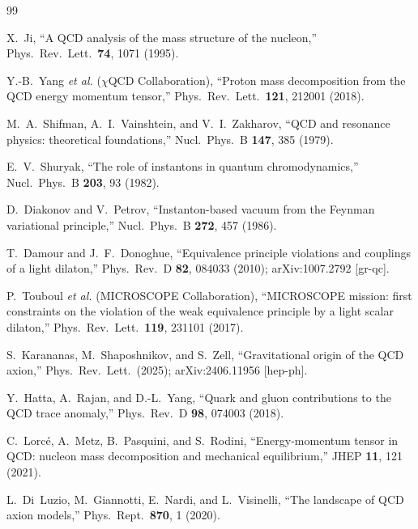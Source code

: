 \documentclass[aps,prd,twocolumn,superscriptaddress,floatfix,nofootinbib]{revtex4-2}
\begin{document}
\begin{thebibliography}{99}

X.~Ji, ``A QCD analysis of the mass structure of the nucleon,''
Phys.\ Rev.\ Lett.\ \textbf{74}, 1071 (1995).

Y.-B.~Yang \emph{et al.} ($\chi$QCD Collaboration),
``Proton mass decomposition from the QCD energy momentum tensor,''
Phys.\ Rev.\ Lett.\ \textbf{121}, 212001 (2018).

M.~A.~Shifman, A.~I.~Vainshtein, and V.~I.~Zakharov,
``QCD and resonance physics: theoretical foundations,''
Nucl.\ Phys.\ B \textbf{147}, 385 (1979).

E.~V.~Shuryak,
``The role of instantons in quantum chromodynamics,''
Nucl.\ Phys.\ B \textbf{203}, 93 (1982).

D.~Diakonov and V.~Petrov,
``Instanton-based vacuum from the Feynman variational principle,''
Nucl.\ Phys.\ B \textbf{272}, 457 (1986).

T.~Damour and J.~F.~Donoghue,
``Equivalence principle violations and couplings of a light dilaton,''
Phys.\ Rev.\ D \textbf{82}, 084033 (2010);
arXiv:1007.2792 [gr-qc].

P.~Touboul \emph{et al.} (MICROSCOPE Collaboration),
``MICROSCOPE mission: first constraints on the violation of the weak
equivalence principle by a light scalar dilaton,''
Phys.\ Rev.\ Lett.\ \textbf{119}, 231101 (2017).

S.~Karananas, M.~Shaposhnikov, and S.~Zell,
``Gravitational origin of the QCD axion,''
Phys.\ Rev.\ Lett.\ (2025);
arXiv:2406.11956 [hep-ph].

Y.~Hatta, A.~Rajan, and D.-L.~Yang,
``Quark and gluon contributions to the QCD trace anomaly,''
Phys.\ Rev.\ D \textbf{98}, 074003 (2018).

C.~Lorc\'{e}, A.~Metz, B.~Pasquini, and S.~Rodini,
``Energy-momentum tensor in QCD: nucleon mass decomposition and mechanical
equilibrium,''
JHEP \textbf{11}, 121 (2021).

L.~Di~Luzio, M.~Giannotti, E.~Nardi, and L.~Visinelli,
``The landscape of QCD axion models,''
Phys.\ Rept.\ \textbf{870}, 1 (2020).


\end{thebibliography}
\end{document}
